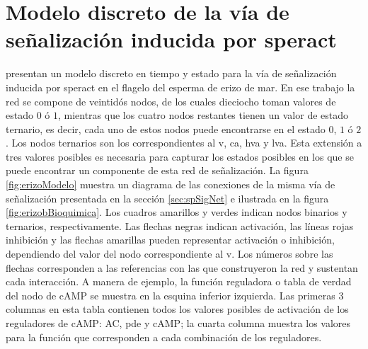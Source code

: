 




\section{Modelo discreto de la vía de señalización inducida por speract}\label{sect:erizo}


\citeauthor{Espinal2011} \citep{Espinal2011} presentan un modelo discreto en tiempo y estado para la vía de señalización inducida por speract en el flagelo del esperma de erizo de mar. En ese trabajo la red se compone de veintidós nodos, de los cuales  dieciocho toman valores de estado $0$ ó $1$, mientras que los cuatro nodos restantes tienen un valor de estado ternario, es decir, cada uno de estos nodos puede encontrarse en el estado $0$, $1$ ó $2$. Los nodos ternarios son los correspondientes al \acf{v}, \acf{ca}, \acf{hva} y \acf{lva}. Esta extensión a tres valores posibles es necesaria para capturar los estados posibles en los que se puede encontrar un componente de esta red de señalización. La figura \ref{fig:erizoModelo} muestra un diagrama de las conexiones de la misma vía de señalización presentada en la sección \ref{sec:spSigNet} e ilustrada en la figura \ref{fig:erizobBioquimica}. Los cuadros amarillos y verdes indican nodos binarios y ternarios, respectivamente. Las flechas negras indican activación, las líneas rojas inhibición y las flechas amarillas pueden representar activación o inhibición, dependiendo del valor del nodo correspondiente al \acf{v}. Los números sobre las flechas corresponden a las referencias con las que \citeauthor{Espinal2011} \citep{Espinal2011} construyeron la red y sustentan cada interacción. A manera de ejemplo, la función reguladora o tabla de verdad del nodo de \ac{cAMP} se muestra en la esquina inferior izquierda. Las primeras 3 columnas en esta tabla contienen todos los valores posibles de activación de los reguladores de \ac{cAMP}: \ac{AC}, \ac{pde} y \ac{cAMP}; la cuarta columna muestra los valores para la función que corresponden a cada combinación de los reguladores.

